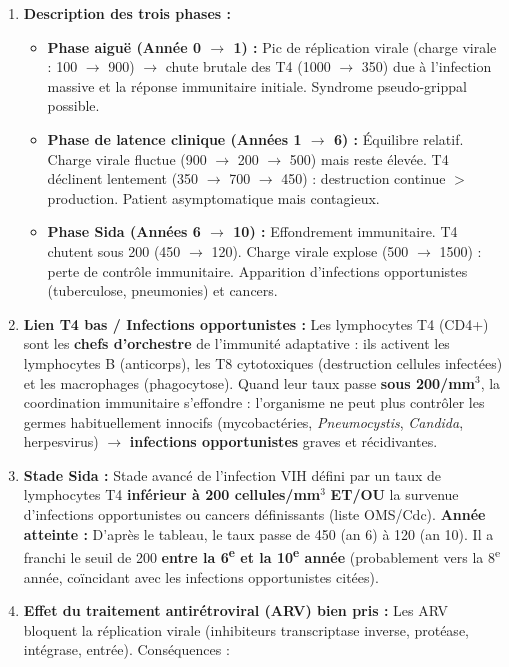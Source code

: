\documentclass[11pt]{article}
\begin{document}
\begin{corrige}
\begin{enumerate}
\item \textbf{Description des trois phases :}
\begin{itemize}
\item \textbf{Phase aiguë (Année 0 $\rightarrow$ 1) :} Pic de réplication virale (charge virale : 100 $\rightarrow$ 900) $\rightarrow$ chute brutale des T4 (1000 $\rightarrow$ 350) due à l'infection massive et la réponse immunitaire initiale. Syndrome pseudo-grippal possible.
\item \textbf{Phase de latence clinique (Années 1 $\rightarrow$ 6) :} Équilibre relatif. Charge virale fluctue (900 $\rightarrow$ 200 $\rightarrow$ 500) mais reste élevée. T4 déclinent lentement (350 $\rightarrow$ 700 $\rightarrow$ 450) : destruction continue $>$ production. Patient asymptomatique mais contagieux.
\item \textbf{Phase Sida (Années 6 $\rightarrow$ 10) :} Effondrement immunitaire. T4 chutent sous 200 (450 $\rightarrow$ 120). Charge virale explose (500 $\rightarrow$ 1500) : perte de contrôle immunitaire. Apparition d'infections opportunistes (tuberculose, pneumonies) et cancers.
\end{itemize}
\item \textbf{Lien T4 bas / Infections opportunistes :} Les lymphocytes T4 (CD4+) sont les \textbf{chefs d'orchestre} de l'immunité adaptative : ils activent les lymphocytes B (anticorps), les T8 cytotoxiques (destruction cellules infectées) et les macrophages (phagocytose). Quand leur taux passe \textbf{sous 200/mm$^3$}, la coordination immunitaire s'effondre : l'organisme ne peut plus contrôler les germes habituellement innocifs (mycobactéries, \emph{Pneumocystis}, \emph{Candida}, herpesvirus) $\rightarrow$ \textbf{infections opportunistes} graves et récidivantes.
\item \textbf{Stade Sida :} Stade avancé de l'infection VIH défini par un taux de lymphocytes T4 \textbf{inférieur à 200 cellules/mm$^3$} \textbf{ET/OU} la survenue d'infections opportunistes ou cancers définissants (liste OMS/Cdc).
\textbf{Année atteinte :} D'après le tableau, le taux passe de 450 (an 6) à 120 (an 10). Il a franchi le seuil de 200 \textbf{entre la 6\textsuperscript{e} et la 10\textsuperscript{e} année} (probablement vers la 8\textsuperscript{e} année, coïncidant avec les infections opportunistes citées).
\item \textbf{Effet du traitement antirétroviral (ARV) bien pris :} Les ARV bloquent la réplication virale (inhibiteurs transcriptase inverse, protéase, intégrase, entrée). Conséquences :

\end{enumerate}
\end{corrige}
\end{document}
